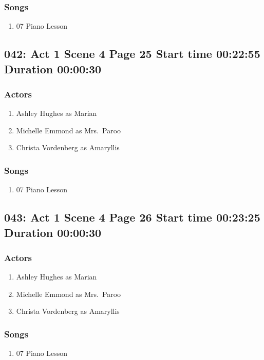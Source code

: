 \subsubsection{Songs}
\begin{enumerate}
\item 07 Piano Lesson
\end{enumerate}
\subsection{042: Act 1 Scene 4 Page 25 Start time 00:22:55 Duration 00:00:30}

\subsubsection{Actors}
\begin{enumerate}
\item Ashley Hughes as Marian
\item Michelle Emmond as Mrs.~Paroo
\item Christa Vordenberg as Amaryllis
\end{enumerate}

\subsubsection{Songs}
\begin{enumerate}
\item 07 Piano Lesson
\end{enumerate}
\subsection{043: Act 1 Scene 4 Page 26 Start time 00:23:25 Duration 00:00:30}

\subsubsection{Actors}
\begin{enumerate}
\item Ashley Hughes as Marian
\item Michelle Emmond as Mrs.~Paroo
\item Christa Vordenberg as Amaryllis
\end{enumerate}

\subsubsection{Songs}
\begin{enumerate}
\item 07 Piano Lesson
\end{enumerate}
